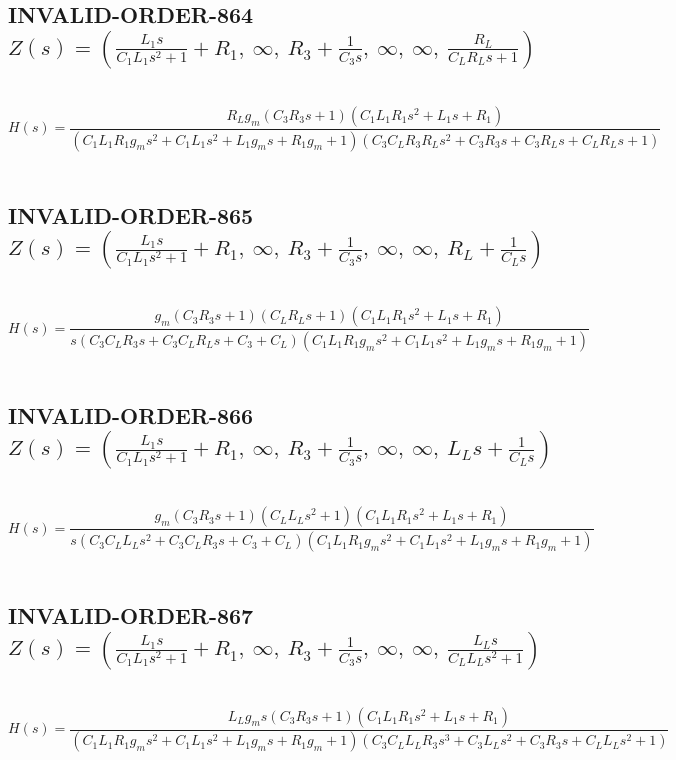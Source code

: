 \documentclass{article}
\begin{document}
\subsection{INVALID-ORDER-864 $Z(s) = \left( \frac{L_{1} s}{C_{1} L_{1} s^{2} + 1} + R_{1}, \  \infty, \  R_{3} + \frac{1}{C_{3} s}, \  \infty, \  \infty, \  \frac{R_{L}}{C_{L} R_{L} s + 1}\right)$ } \ 
\textbf{\[H(s) = \frac{R_{L} g_{m} \left(C_{3} R_{3} s + 1\right) \left(C_{1} L_{1} R_{1} s^{2} + L_{1} s + R_{1}\right)}{\left(C_{1} L_{1} R_{1} g_{m} s^{2} + C_{1} L_{1} s^{2} + L_{1} g_{m} s + R_{1} g_{m} + 1\right) \left(C_{3} C_{L} R_{3} R_{L} s^{2} + C_{3} R_{3} s + C_{3} R_{L} s + C_{L} R_{L} s + 1\right)}\] } \ 
\subsection{INVALID-ORDER-865 $Z(s) = \left( \frac{L_{1} s}{C_{1} L_{1} s^{2} + 1} + R_{1}, \  \infty, \  R_{3} + \frac{1}{C_{3} s}, \  \infty, \  \infty, \  R_{L} + \frac{1}{C_{L} s}\right)$ } \ 
\textbf{\[H(s) = \frac{g_{m} \left(C_{3} R_{3} s + 1\right) \left(C_{L} R_{L} s + 1\right) \left(C_{1} L_{1} R_{1} s^{2} + L_{1} s + R_{1}\right)}{s \left(C_{3} C_{L} R_{3} s + C_{3} C_{L} R_{L} s + C_{3} + C_{L}\right) \left(C_{1} L_{1} R_{1} g_{m} s^{2} + C_{1} L_{1} s^{2} + L_{1} g_{m} s + R_{1} g_{m} + 1\right)}\] } \ 
\subsection{INVALID-ORDER-866 $Z(s) = \left( \frac{L_{1} s}{C_{1} L_{1} s^{2} + 1} + R_{1}, \  \infty, \  R_{3} + \frac{1}{C_{3} s}, \  \infty, \  \infty, \  L_{L} s + \frac{1}{C_{L} s}\right)$ } \ 
\textbf{\[H(s) = \frac{g_{m} \left(C_{3} R_{3} s + 1\right) \left(C_{L} L_{L} s^{2} + 1\right) \left(C_{1} L_{1} R_{1} s^{2} + L_{1} s + R_{1}\right)}{s \left(C_{3} C_{L} L_{L} s^{2} + C_{3} C_{L} R_{3} s + C_{3} + C_{L}\right) \left(C_{1} L_{1} R_{1} g_{m} s^{2} + C_{1} L_{1} s^{2} + L_{1} g_{m} s + R_{1} g_{m} + 1\right)}\] } \ 
\subsection{INVALID-ORDER-867 $Z(s) = \left( \frac{L_{1} s}{C_{1} L_{1} s^{2} + 1} + R_{1}, \  \infty, \  R_{3} + \frac{1}{C_{3} s}, \  \infty, \  \infty, \  \frac{L_{L} s}{C_{L} L_{L} s^{2} + 1}\right)$ } \ 
\textbf{\[H(s) = \frac{L_{L} g_{m} s \left(C_{3} R_{3} s + 1\right) \left(C_{1} L_{1} R_{1} s^{2} + L_{1} s + R_{1}\right)}{\left(C_{1} L_{1} R_{1} g_{m} s^{2} + C_{1} L_{1} s^{2} + L_{1} g_{m} s + R_{1} g_{m} + 1\right) \left(C_{3} C_{L} L_{L} R_{3} s^{3} + C_{3} L_{L} s^{2} + C_{3} R_{3} s + C_{L} L_{L} s^{2} + 1\right)}\] } \ 
\end{document}
